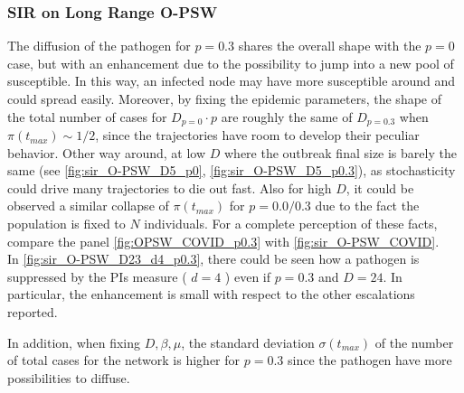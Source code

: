 \documentclass[a4paper,10pt,twoside]{book} %
\theoremstyle{definition}
\begin{document}
\subsubsection*{SIR on Long Range O-PSW}
The diffusion of the pathogen for $p = 0.3$ shares the overall shape with the $p = 0$ case, but with an enhancement due to the possibility to jump into a new pool of susceptible. In this way, an infected node may have more susceptible around and could spread easily. Moreover, by fixing the epidemic parameters, the shape of the total number of cases for $D_{p=0} \cdot p$ are roughly the same of $D_{p=0.3}$ when $\pi(t_{max}) \sim 1/2$, since the trajectories have room to develop their peculiar behavior. Other way around, at low $D$ where the outbreak final size is barely the same (see \autoref{fig:sir_O-PSW_D5_p0}, 
\autoref{fig:sir_O-PSW_D5_p0.3}), as stochasticity could drive many trajectories to die out fast. Also for high $D$, it could be observed a similar collapse of $\pi(t_{max})$ for $p = 0.0 / 0.3$  due to the fact the population is fixed to $N$ individuals. For a complete perception of these facts, compare the panel \autoref{fig:OPSW_COVID_p0.3} with \autoref{fig:sir_O-PSW_COVID}.\\
In \autoref{fig:sir_O-PSW_D23_d4_p0.3}, there could be seen how a pathogen is suppressed by the PIs measure ( $ d = 4$ ) even if $ p=0.3$ and $ D = 24$. In particular, the enhancement is small with respect to the other escalations reported.

In addition, when fixing $D, \beta, \mu$, the standard deviation $\sigma(t_{max})$ of the number of total cases for the network is higher for $p = 0.3$ since the pathogen have more possibilities to diffuse.
\end{document}
